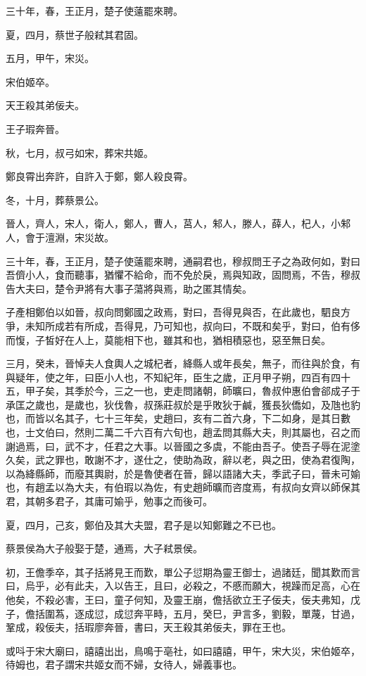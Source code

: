 \begin{pinyinscope}
三十年，春，王正月，楚子使薳罷來聘。

夏，四月，蔡世子般弒其君固。

五月，甲午，宋災。

宋伯姬卒。

天王殺其弟佞夫。

王子瑕奔晉。

秋，七月，叔弓如宋，葬宋共姬。

鄭良霄出奔許，自許入于鄭，鄭人殺良霄。

冬，十月，葬蔡景公。

晉人，齊人，宋人，衛人，鄭人，曹人，莒人，邾人，滕人，薛人，杞人，小邾人，會于澶淵，宋災故。

三十年，春，王正月，楚子使薳罷來聘，通嗣君也，穆叔問王子之為政何如，對曰吾儕小人，食而聽事，猶懼不給命，而不免於戾，焉與知政，固問焉，不告，穆叔告大夫曰，楚令尹將有大事子蕩將與焉，助之匿其情矣。

子產相鄭伯以如晉，叔向問鄭國之政焉，對曰，吾得見與否，在此歲也，駟良方爭，未知所成若有所成，吾得見，乃可知也，叔向曰，不既和矣乎，對曰，伯有侈而愎，子皙好在人上，莫能相下也，雖其和也，猶相積惡也，惡至無日矣。

三月，癸未，晉悼夫人食輿人之城杞者，絳縣人或年長矣，無子，而往與於食，有與疑年，使之年，曰臣小人也，不知紀年，臣生之歲，正月甲子朔，四百有四十五，甲子矣，其季於今，三之一也，吏走問諸朝，師曠曰，魯叔仲惠伯會郤成子于承匡之歲也，是歲也，狄伐魯，叔孫莊叔於是乎敗狄于鹹，獲長狄僑如，及虺也豹也，而皆以名其子，七十三年矣，史趙曰，亥有二首六身，下二如身，是其日數也，士文伯曰，然則二萬二千六百有六旬也，趙孟問其縣大夫，則其屬也，召之而謝過焉，曰，武不才，任君之大事。以晉國之多虞，不能由吾子。使吾子辱在泥塗久矣，武之罪也，敢謝不才，遂仕之，使助為政，辭以老，與之田，使為君復陶，以為絳縣師，而廢其輿尉，於是魯使者在晉，歸以語諸大夫，季武子曰，晉未可媮也，有趙孟以為大夫，有伯瑕以為佐，有史趙師曠而咨度焉，有叔向女齊以師保其君，其朝多君子，其庸可媮乎，勉事之而後可。

夏，四月，己亥，鄭伯及其大夫盟，君子是以知鄭難之不已也。

蔡景侯為大子般娶于楚，通焉，大子弒景侯。

初，王儋季卒，其子括將見王而歎，單公子愆期為靈王御士，過諸廷，聞其歎而言曰，烏乎，必有此夫，入以告王，且曰，必殺之，不慼而願大，視躁而足高，心在他矣，不殺必害，王曰，童子何知，及靈王崩，儋括欲立王子佞夫，佞夫弗知，戊子，儋括圍蒍，逐成愆，成愆奔平畤，五月，癸巳，尹言多，劉毅，單蔑，甘過，鞏成，殺佞夫，括瑕廖奔晉，書曰，天王殺其弟佞夫，罪在王也。

或呌于宋大廟曰，譆譆出出，鳥鳴于亳社，如曰譆譆，甲午，宋大災，宋伯姬卒，待姆也，君子謂宋共姬女而不婦，女待人，婦義事也。


\end{pinyinscope}
